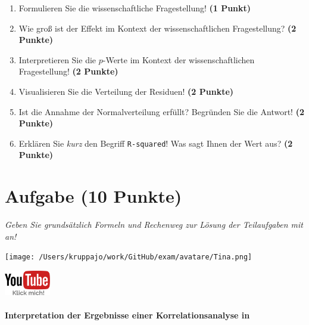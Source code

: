 \documentclass[a4paper, 9pt]{scrartcl}\usepackage[]{graphicx}\usepackage[]{xcolor}
\begin{document}
\begin{enumerate}
\item Formulieren Sie die wissenschaftliche Fragestellung! \textbf{(1 Punkt)}
\item Wie groß ist der Effekt im Kontext der wissenschaftlichen Fragestellung? \textbf{(2 Punkte)} 
\item Interpretieren Sie die $p$-Werte im Kontext der wissenschaftlichen Fragestellung! \textbf{(2 Punkte)}
\item Visualisieren Sie die Verteilung der Residuen! \textbf{(2 Punkte)} 
\item Ist die Annahme der Normalverteilung erfüllt? Begründen Sie die Antwort! \textbf{(2 Punkte)}
\item Erklären Sie \textit{kurz} den Begriff \texttt{R-squared}! Was sagt Ihnen der Wert aus? \textbf{(2 Punkte)}
\end{enumerate}
 
\clearpage

\section{Aufgabe \hfill (10 Punkte)}

\textit{Geben Sie grundsätzlich Formeln und Rechenweg zur Lösung der Teilaufgaben mit an!} \\[1Ex]
 

 
\begin{minipage}[t]{0.5\textwidth}
\texttt{[image: /Users/kruppajo/work/GitHub/exam/avatare/Tina.png]}
\end{minipage}
\begin{minipage}[t]{0.5\textwidth}
\hfill
\href{https://youtu.be/C9skfFRTHhI}{\includegraphics[width = 2cm]{img/youtube}}
\end{minipage}
\vspace{-3ex}



\paragraph{Interpretation der Ergebnisse einer Korrelationsanalyse in \Rlogo}
\end{document}

